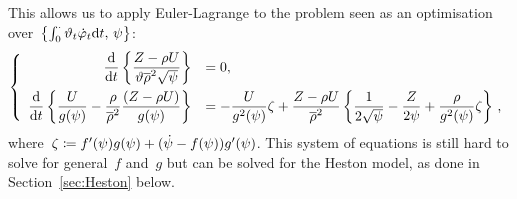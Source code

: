 This allows us to apply Euler-Lagrange to the problem seen as an optimisation over~$\left\{\int_0^\cdot \vartheta_t \dot{\varphi}_t \mathrm{d} t,\,\psi\right\}$:
\begin{equation}\label{eq:LDPLargeTimeGeneral}
\left\{
\begin{array}{rl}
\displaystyle \frac{\mathrm{d}}{\mathrm{d} t}\left\{
\frac{Z - \rho U}{\vartheta \overline{\rho}^2\sqrt{\psi}} \right\} &= 0, \\[10pt]
\displaystyle \frac{\mathrm{d}}{\mathrm{d} t}\left\{ \frac{U}{g(\psi)} - \frac{\rho}{\overline{\rho}^2}\frac{(Z - \rho U)}{g(\psi)} \right\}
&= \displaystyle - \frac{U}{g^2(\psi)}\zeta + \frac{Z-\rho U}{\overline{\rho}^2}\left\{ \frac{1}{2\sqrt{\psi}} - \frac{Z}{2\psi} + \frac{\rho}{g^2(\psi)}\zeta \right\}\,,
\end{array}
\right.
\end{equation}
where~$\zeta \coloneqq f'(\psi)g(\psi) + (\dot{\psi}-f(\psi))g'(\psi)$. This system of equations is still hard to solve for general~$f$ and~$g$ 
but can be solved for the Heston model,
as done in Section~\ref{sec:Heston} below.

